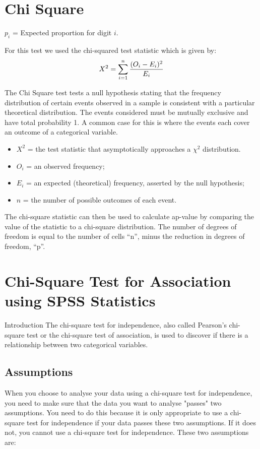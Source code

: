\documentclass[]{report}
\begin{document}
\section{Chi Square}


$p_{i}$ = Expected proportion for digit $i$.

For this test we used the chi-squared test statistic which is given by:
\begin{equation}
X^2 = \sum_{i=1}^{n} {(O_i - E_i)^2 \over E_i}
\end{equation}


The Chi Square test tests a null hypothesis stating that the frequency distribution of certain events observed in a sample is consistent with a particular theoretical distribution. The events considered must be mutually exclusive and have total probability 1. A common case for this is where the events each cover an outcome of a categorical variable.

\begin{itemize}
	\item $X^2$ = the test statistic that asymptotically approaches a $\chi^2$ distribution.
	\item $O_i$ = an observed frequency;
	\item $E_i$ = an expected (theoretical) frequency, asserted by the null hypothesis;
	\item $n $  = the number of possible outcomes of each event.
\end{itemize}

The chi-square statistic can then be used to calculate ap-value by comparing the value of the statistic to a chi-square distribution. The number of degrees of freedom is equal to the number of cells ``n'', minus the reduction in degrees of freedom, ``p''.



\section{Chi-Square Test for Association using SPSS Statistics}

Introduction
The chi-square test for independence, also called Pearson's chi-square test or the chi-square test of association, is used to discover if there is a relationship between two categorical variables.


\subsection{Assumptions}
When you choose to analyse your data using a chi-square test for independence, you need to make sure that the data you want to analyse "passes" two assumptions. You need to do this because it is only appropriate to use a chi-square test for independence if your data passes these two assumptions. If it does not, you cannot use a chi-square test for independence. These two assumptions are:
\end{document}
